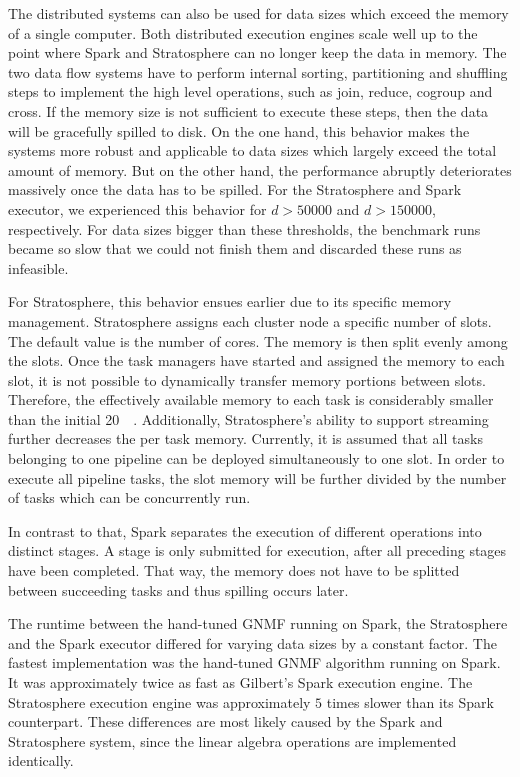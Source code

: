 The distributed systems can also be used for data sizes which exceed the memory of a single computer.
Both distributed execution engines scale well up to the point where Spark and Stratosphere can no longer keep the data in memory.
The two data flow systems have to perform internal sorting, partitioning and shuffling steps to implement the high level operations, such as join, reduce, cogroup and cross.
If the memory size is not sufficient to execute these steps, then the data will be gracefully spilled to disk.
On the one hand, this behavior makes the systems more robust and applicable to data sizes which largely exceed the total amount of memory.
But on the other hand, the performance abruptly deteriorates massively once the data has to be spilled.
For the Stratosphere and Spark executor, we experienced this behavior for $d>50000$ and $d>150000$, respectively.
For data sizes bigger than these thresholds, the benchmark runs became so slow that we could not finish them and discarded these runs as infeasible.

For Stratosphere, this behavior ensues earlier due to its specific memory management.
Stratosphere assigns each cluster node a specific number of slots.
The default value is the number of cores.
The memory is then split evenly among the slots.
Once the task managers have started and assigned the memory to each slot, it is not possible to dynamically transfer memory portions between slots.
Therefore, the effectively available memory to each task is considerably smaller than the initial \SI{20}{\giga\byte}.
Additionally, Stratosphere's ability to support streaming further decreases the per task memory.
Currently, it is assumed that all tasks belonging to one pipeline can be deployed simultaneously to one slot.
In order to execute all pipeline tasks, the slot memory will be further divided by the number of tasks which can be concurrently run.

In contrast to that, Spark separates the execution of different operations into distinct stages.
A stage is only submitted for execution, after all preceding stages have been completed.
That way, the memory does not have to be splitted between succeeding tasks and thus spilling occurs later.

The runtime between the hand-tuned GNMF running on Spark, the Stratosphere and the Spark executor differed for varying data sizes by a constant factor.
The fastest implementation was the hand-tuned GNMF algorithm running on Spark.
It was approximately twice as fast as Gilbert's Spark execution engine.
The Stratosphere execution engine was approximately $5$ times slower than its Spark counterpart.
These differences are most likely caused by the Spark and Stratosphere system, since the linear algebra operations are implemented identically.

